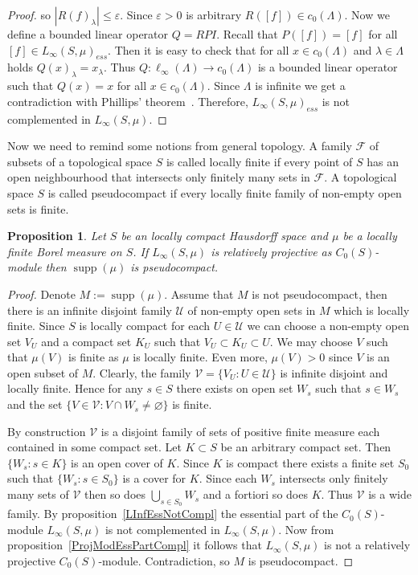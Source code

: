 \documentclass[12pt]{article}
\newtheorem{proposition}[theorem]{Proposition}
\begin{document}
\begin{proof}
    so $|{R(f)}_\lambda|\leq\varepsilon$. Since $\varepsilon>0$ is arbitrary
    $R([f])\in c_0(\Lambda)$. Now we define a bounded linear operator $Q=RPI$.
    Recall that $P([f])=[f]$ for all $[f]\in {L_\infty(S,\mu)}_{ess}$. Then it
    is easy to check that for all $x\in c_0(\Lambda)$ and $\lambda\in\Lambda$
    holds ${Q(x)}_\lambda=x_\lambda$. Thus $Q:\ell_\infty(\Lambda)\to
        c_0(\Lambda)$ is a bounded linear operator such that $Q(x)=x$ for all $x\in
        c_0(\Lambda)$. Since $\Lambda$ is infinite we get a contradiction with
    Phillips' theorem~\cite{PhilOnLinTran}. Therefore, ${L_\infty(S,\mu)}_{ess}$
    is not complemented in $L_\infty(S,\mu)$.
\end{proof}

Now we need to remind some notions from general topology. A family $\mathcal{F}$
of subsets of a topological space $S$ is called locally finite if every point of
$S$ has an open neighbourhood that intersects only finitely many sets in
$\mathcal{F}$. A topological space $S$ is called pseudocompact if every locally
finite family of non-empty open sets is finite.

\begin{proposition}\label{LInfRelProjSuppCond} Let $S$ be an locally compact
    Hausdorff space and $\mu$ be a locally finite Borel measure on $S$. If
    $L_\infty(S,\mu)$ is relatively projective as $C_0(S)$-module then
    $\operatorname{supp}(\mu)$ is pseudocompact.
\end{proposition}
\begin{proof} Denote $M:=\operatorname{supp}(\mu)$. Assume that $M$ is not
    pseudocompact, then there is an infinite disjoint family $\mathcal{U}$ of
    non-empty open sets in $M$ which is locally finite. Since $S$ is locally
    compact for each $U\in\mathcal{U}$ we can choose a non-empty open set $V_U$
    and a compact set $K_U$ such that $V_U\subset K_U\subset  U$. We may choose
    $V$ such that $\mu(V)$ is finite as $\mu$ is locally finite. Even more,
    $\mu(V)>0$ since $V$ is an open subset of $M$. Clearly, the family
    $\mathcal{V}=\{V_U:U\in\mathcal{U}\}$ is infinite disjoint and locally
    finite. Hence for any $s\in S$ there exists on open set $W_s$ such that
    $s\in W_s$ and the set $\{V\in\mathcal{V}: V\cap W_s\neq\varnothing \}$ is
    finite.

    By construction $\mathcal{V}$ is a disjoint family of sets of positive
    finite measure each contained in some compact set. Let $K\subset S$ be an
    arbitrary compact set. Then $\{W_s:s\in K\}$ is an open cover of $K$. Since
    $K$ is compact there exists a finite set $S_0$ such that $\{W_s:s\in S_0\}$
    is a cover for $K$. Since each $W_s$ intersects only finitely many sets of
    $\mathcal{V}$ then so does $\bigcup_{s\in S_0}W_s$ and a fortiori so does
    $K$. Thus $\mathcal{V}$ is a wide family. By
    proposition~\ref{LInfEssNotCompl} the essential part of the $C_0(S)$-module
    $L_\infty(S,\mu)$ is not complemented in $L_\infty(S,\mu)$. Now from
    proposition~\ref{ProjModEssPartCompl} it follows that $L_\infty(S,\mu)$ is
    not a relatively projective $C_0(S)$-module. Contradiction, so $M$ is
    pseudocompact.
\end{proof}
\end{document}
